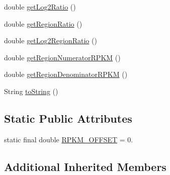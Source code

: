 \begin{DoxyCompactItemize}
\item 
double \hyperlink{classumms_1_1core_1_1model_1_1score_1_1_new_ratio_score_a138a5c44c26357eede46db62a0030899}{get\+Log2\+Ratio} ()
\item 
double \hyperlink{classumms_1_1core_1_1model_1_1score_1_1_new_ratio_score_a7d5afcbe79df879267e40808def116e9}{get\+Region\+Ratio} ()
\item 
double \hyperlink{classumms_1_1core_1_1model_1_1score_1_1_new_ratio_score_ab9b35ce818f5f17c1bdf64a60610dd82}{get\+Log2\+Region\+Ratio} ()
\item 
double \hyperlink{classumms_1_1core_1_1model_1_1score_1_1_new_ratio_score_a26a42d5b27ecffe6bc7be64b5986d8fb}{get\+Region\+Numerator\+R\+P\+K\+M} ()
\item 
double \hyperlink{classumms_1_1core_1_1model_1_1score_1_1_new_ratio_score_a1584f84d271b371c3bb7ec7bfe7b0f48}{get\+Region\+Denominator\+R\+P\+K\+M} ()
\item 
String \hyperlink{classumms_1_1core_1_1model_1_1score_1_1_new_ratio_score_ae8767f8a4d1aa3613992cb4f43119669}{to\+String} ()
\end{DoxyCompactItemize}
\subsection*{Static Public Attributes}
\begin{DoxyCompactItemize}
\item 
static final double \hyperlink{classumms_1_1core_1_1model_1_1score_1_1_new_ratio_score_a9f1a855b2ca18a693ebf4507f84893be}{R\+P\+K\+M\+\_\+\+O\+F\+F\+S\+E\+T} = 0.
\end{DoxyCompactItemize}
\subsection*{Additional Inherited Members}


